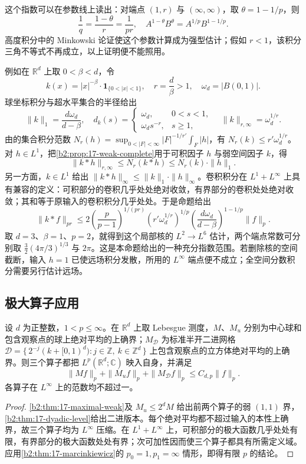 这个指数可以在参数线上读出：对端点 \((1,r)\) 与 \((\infty,\infty)\)，取 \(\theta=1-1/p\)，则
\[
 \frac1q=\frac{1-\theta}r=\frac1{pr},
 \quad A^{1-\theta}B^\theta=A^{1/p}B^{1-1/p}.
\]
高度积分中的 Minkowski 论证使这个参数计算成为强型估计；假如 \(r<1\)，该积分三角不等式不再成立，以上证明便不能照用。

\ProseParagraphBreak

例如在 \(\mathbb R^d\) 上取 \(0<\beta<d\)，令
\[
 k(x)=|x|^{-\beta}\cdot\mathbf1_{\{0<|x|<1\}},
 \quad r=\frac d\beta>1,
 \quad \omega_d=|B(0,1)|.
\]
球坐标积分与超水平集合的半径给出
\[
 \|k\|_1=\frac{d\omega_d}{d-\beta},
 \quad
 d_k(s)=\begin{cases}\omega_d,&0<s<1,\\
                         \omega_ds^{-r},&s\geq1,
          \end{cases}
 \quad \|k\|_{r,\infty}=\omega_d^{1/r}.
\]
由的集合积分范数
\(N_r(h)=\sup_{0<|F|<\infty}|F|^{-1/r'}\int_F|h|\)，有
\(N_r(k)\leq r'\omega_d^{1/r}\)。对 \(h\in L^1\)，把\cref{b2:prop:17-weak-complete}用于可积因子 \(h\) 与弱空间因子 \(k\)，得
\[
 \|k*h\|_{r,\infty}\leq N_r(k*h)
 \leq N_r(k)\cdot\|h\|_1.
\]
另一方面，\(k\in L^1\) 给出
\(\|k*h\|_\infty\leq\|k\|_1\cdot\|h\|_\infty\)。卷积积分在 \(L^1+L^\infty\) 上具有兼容的定义：可积部分的卷积几乎处处绝对收敛，有界部分的卷积处处绝对收敛；其和等于原输入的卷积积分几乎处处。于是命题给出
\[
 \|k*f\|_{pr}
 \leq 2\left(\frac p{p-1}\right)^{1/(pr)}
       (r'\omega_d^{1/r})^{1/p}
       \left(\frac{d\omega_d}{d-\beta}\right)^{1-1/p}\|f\|_p.
\]
取 \(d=3\)、\(\beta=1\)、\(p=2\)，就得到这个局部核的 \(L^2\to L^6\) 估计，两个端点常数可分别取 \(\tfrac32(4\pi/3)^{1/3}\) 与 \(2\pi\)。这是本命题给出的一种充分指数范围。若删除核的空间截断，输入 \(h=1\) 已使远场积分发散，所用的 \(L^\infty\) 端点便不成立；全空间分数积分需要另行估计远场。

\subsection{极大算子应用}
\label{b2:subsec:170304}

\begin{corollary}\label{b2:thm:17-maximal-strong}
设 \(d\) 为正整数，\(1<p\leq\infty\)。在 \(\mathbb R^d\) 上取 Lebesgue 测度，\(M\)、\(M_u\) 分别为中心球和包含观察点的球上绝对平均的上确界；\(M_{\mathcal D}\) 为标准半开二进网格
\(\mathcal D=\{\,2^{-j}(k+[0,1)^d):j\in\mathbb Z,\ k\in\mathbb Z^d\,\}\)
上包含观察点的立方体绝对平均的上确界。则三个算子都把 \(L^p(\mathbb R^d;\mathbb C)\) 映入自身，并满足
\[
 \|Mf\|_p+\|M_uf\|_p+\|M_{\mathcal D}f\|_p
 \leq C_{d,p}\|f\|_p.
\]
各算子在 \(L^\infty\) 上的范数均不超过一。
\end{corollary}
\begin{proof}
\cref{b2:thm:17-maximal-weak}及 \(M_u\leq2^dM\) 给出前两个算子的弱 \((1,1)\) 界，\cref{b2:thm:17-dyadic-level}给出二进版本。每个绝对平均都不超过输入的本性上确界，故三个算子均为 \(L^\infty\) 压缩。在 \(L^1+L^\infty\) 上，可积部分的极大函数几乎处处有限，有界部分的极大函数处处有界；次可加性因而使三个算子都具有所需定义域。应用\cref{b2:thm:17-marcinkiewicz}的 \(p_0=1,p_1=\infty\) 情形，即得有限 \(p\) 的结论。
\end{proof}

